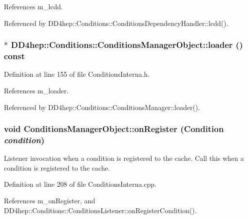 References m\_\-lcdd.

Referenced by DD4hep::Conditions::ConditionsDependencyHandler::lcdd().\hypertarget{class_d_d4hep_1_1_conditions_1_1_conditions_manager_object_ad0e321f7b3bd3abf8a6ccac213c022b8}{
\subsubsection[{loader}]{$\ast$ DD4hep::Conditions::ConditionsManagerObject::loader () const}}
\label{class_d_d4hep_1_1_conditions_1_1_conditions_manager_object_ad0e321f7b3bd3abf8a6ccac213c022b8}


Definition at line 155 of file ConditionsInterna.h.

References m\_\-loader.

Referenced by DD4hep::Conditions::ConditionsManager::loader().\hypertarget{class_d_d4hep_1_1_conditions_1_1_conditions_manager_object_a872970f1bb67a3d225be8c63422f848f}{
\subsubsection[{onRegister}]{\setlength{\rightskip}{0pt plus 5cm}void ConditionsManagerObject::onRegister ({\bf Condition} {\em condition})}}
\label{class_d_d4hep_1_1_conditions_1_1_conditions_manager_object_a872970f1bb67a3d225be8c63422f848f}


Listener invocation when a condition is registered to the cache. Call this when a condition is registered to the cache. 

Definition at line 208 of file ConditionsInterna.cpp.

References m\_\-onRegister, and DD4hep::Conditions::ConditionsListener::onRegisterCondition().

